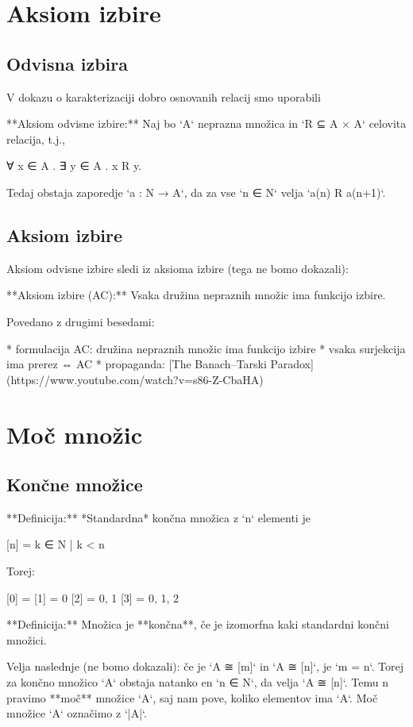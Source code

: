 \chapter{Aksiom izbire}

\section{Odvisna izbira}

V dokazu o karakterizaciji dobro osnovanih relacij smo uporabili

**Aksiom odvisne izbire:**
Naj bo `A` neprazna množica in `R ⊆ A × A` celovita relacija, t.j.,

    ∀ x ∈ A . ∃ y ∈ A . x R y.

Tedaj obstaja zaporedje `a : N → A`, da za vse `n ∈ N` velja `a(n) R a(n+1)`.

\section{Aksiom izbire}

Aksiom odvisne izbire sledi iz aksioma izbire (tega ne bomo dokazali):

**Aksiom izbire (AC):** Vsaka družina nepraznih množic ima funkcijo izbire.

Povedano z drugimi besedami:

* formulacija AC: družina nepraznih množic ima funkcijo izbire
* vsaka surjekcija ima prerez ⇔ AC
* propaganda: [The Banach–Tarski Paradox](https://www.youtube.com/watch?v=s86-Z-CbaHA)


\chapter{Moč množic}

\section{Končne množice}

**Definicija:** *Standardna* končna množica z `n` elementi je

    [n] = {k ∈ N | k < n}

Torej:

    [0] = {}
    [1] = {0}
    [2] = {0, 1}
    [3] = {0, 1, 2}

**Definicija:** Množica je **končna**, če je izomorfna kaki standardni končni množici.

Velja naslednje (ne bomo dokazali): če je `A ≅ [m]` in `A ≅ [n]`, je `m = n`. Torej za končno
množico `A` obstaja natanko en `n ∈ N`, da velja `A ≅ [n]`. Temu n pravimo **moč** množice `A`,
saj nam pove, koliko elementov ima `A`. Moč množice `A` označimo z `|A|`.

